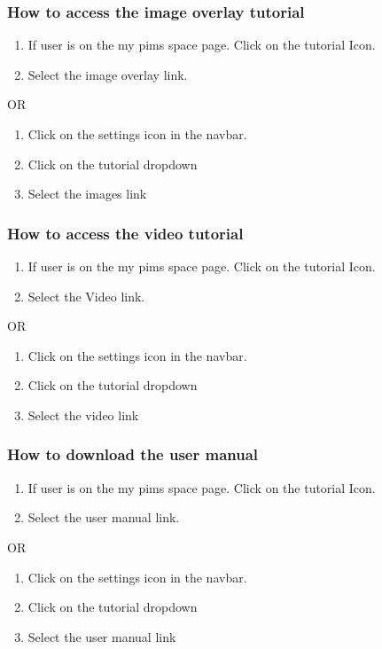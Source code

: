 \documentclass[14pt, a4paper]{article}
\begin{document}
	\subsubsection{How to access the image overlay tutorial}
		\begin{enumerate}
			\item If user is on the my pims space page. Click on the tutorial Icon.
			\item Select the image overlay link.
		\end{enumerate}
		\begin{center}OR\end{center}
		\begin{enumerate}
			\item Click on the settings icon in the navbar.
			\item Click on the tutorial dropdown
			\item Select the images link
		\end{enumerate}
	\subsubsection{How to access the video tutorial}
		\begin{enumerate}
			\item If user is on the my pims space page. Click on the tutorial Icon.
			\item Select the Video link.
		\end{enumerate}
		\begin{center}OR\end{center}
		\begin{enumerate}
			\item Click on the settings icon in the navbar.
			\item Click on the tutorial dropdown
			\item Select the video link
		\end{enumerate}
	\subsubsection{How to download the user manual}
		\begin{enumerate}
			\item If user is on the my pims space page. Click on the tutorial Icon.
			\item Select the user manual link.
		\end{enumerate}
		\begin{center}OR\end{center}
		\begin{enumerate}
			\item Click on the settings icon in the navbar.
			\item Click on the tutorial dropdown
			\item Select the user manual link
		\end{enumerate}
\newpage
\end{document}
